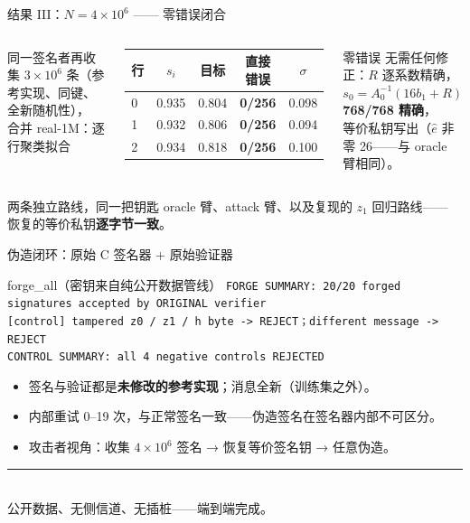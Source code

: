 \documentclass[11pt,aspectratio=169]{ctexbeamer}
\begin{document}
\begin{frame}{结果 III：$N=4\times10^6$ —— 零错误闭合}
  \begin{columns}[T]
    \small 同一签名者再收集 $3\times10^6$ 条（参考实现、同键、全新随机性），
    合并 real-1M：逐行聚类拟合
    \begin{center}
    \begin{tabular}{lcccc}
    \toprule
    行 & $s_i$ & 目标 & 直接错误 & $\sigma$\\
    \midrule
    0 & 0.935 & 0.804 & \textbf{0/256} & 0.098\\
    1 & 0.932 & 0.806 & \textbf{0/256} & 0.094\\
    2 & 0.934 & 0.818 & \textbf{0/256} & 0.100\\
    \bottomrule
    \end{tabular}
    \end{center}
    \begin{alertblock}{零错误}
      \small 无需任何修正：$R$ 逐系数精确，\\
      $s_0 = A_0^{-1}(16b_1+R)$ \textbf{768/768 精确}，\\
      等价私钥写出（$\hat e$ 非零 26——与 oracle 臂相同）。
    \end{alertblock}
  \end{columns}
  \vspace{0.2em}
  \begin{block}{两条独立路线，同一把钥匙}
    \small oracle 臂、attack 臂、以及复现的 $z_1$ 回归路线——
    恢复的等价私钥\textbf{逐字节一致}。
  \end{block}
\end{frame}

\begin{frame}{伪造闭环：原始 C 签名器 + 原始验证器}
  \begin{exampleblock}{forge\_all（密钥来自纯公开数据管线）}
    \small
    \texttt{FORGE SUMMARY: 20/20 forged signatures accepted by ORIGINAL verifier}\\
    \texttt{[control] tampered z0 / z1 / h byte -> REJECT；different message -> REJECT}\\
    \texttt{CONTROL SUMMARY: all 4 negative controls REJECTED}
  \end{exampleblock}
  \begin{itemize}
    \item 签名与验证都是\textbf{未修改的参考实现}；消息全新（训练集之外）。
    \item 内部重试 0--19 次，与正常签名一致——伪造签名在签名器内部不可区分。
    \item 攻击者视角：收集 $4\times10^6$ 签名 → 恢复等价签名钥 → 任意伪造。
  \end{itemize}
  \begin{center}
    {\color{ravbronze}\rule{0.5\textwidth}{1pt}}\\
    {\small 公开数据、无侧信道、无插桩——端到端完成。}
  \end{center}
\end{frame}
\end{document}
